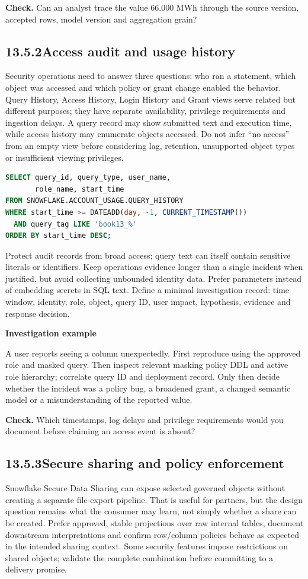 \documentclass[11pt,twoside]{article}
\newcommand{\topic}[2]{\subsection*{#1\quad #2}}
\begin{document}
\textbf{Check.} Can an analyst trace the value 66.000 MWh through the source version, accepted rows, model version and aggregation grain?
\newpage
\topic{13.5.2}{Access audit and usage history}
Security operations need to answer three questions: who ran a statement, which object was accessed and which policy or grant change enabled the behavior. Query History, Access History, Login History and Grant views serve related but different purposes; they have separate availability, privilege requirements and ingestion delays. A query record may show submitted text and execution time, while access history may enumerate objects accessed. Do not infer ``no access'' from an empty view before considering lag, retention, unsupported object types or insufficient viewing privileges.
\begin{lstlisting}[language=SQL,caption={Read-only audit pattern; account-usage rights required.}]
SELECT query_id, query_type, user_name,
       role_name, start_time
FROM SNOWFLAKE.ACCOUNT_USAGE.QUERY_HISTORY
WHERE start_time >= DATEADD(day, -1, CURRENT_TIMESTAMP())
  AND query_tag LIKE 'book13_%'
ORDER BY start_time DESC;
\end{lstlisting}
Protect audit records from broad access; query text can itself contain sensitive literals or identifiers. Keep operations evidence longer than a single incident when justified, but avoid collecting unbounded identity data. Prefer parameters instead of embedding secrets in SQL text. Define a minimal investigation record: time window, identity, role, object, query ID, user impact, hypothesis, evidence and response decision.
\begin{whitebox}\textbf{Investigation example}\par
A user reports seeing a column unexpectedly. First reproduce using the approved role and masked query. Then inspect relevant masking policy DDL and active role hierarchy; correlate query ID and deployment record. Only then decide whether the incident was a policy bug, a broadened grant, a changed semantic model or a misunderstanding of the reported value.
\end{whitebox}
\textbf{Check.} Which timestamps, log delays and privilege requirements would you document before claiming an access event is absent?
\newpage
\topic{13.5.3}{Secure sharing and policy enforcement}
Snowflake Secure Data Sharing can expose selected governed objects without creating a separate file-export pipeline. That is useful for partners, but the design question remains what the consumer may learn, not simply whether a share can be created. Prefer approved, stable projections over raw internal tables, document downstream interpretations and confirm row/column policies behave as expected in the intended sharing context. Some security features impose restrictions on shared objects; validate the complete combination before committing to a delivery promise.
\end{document}
